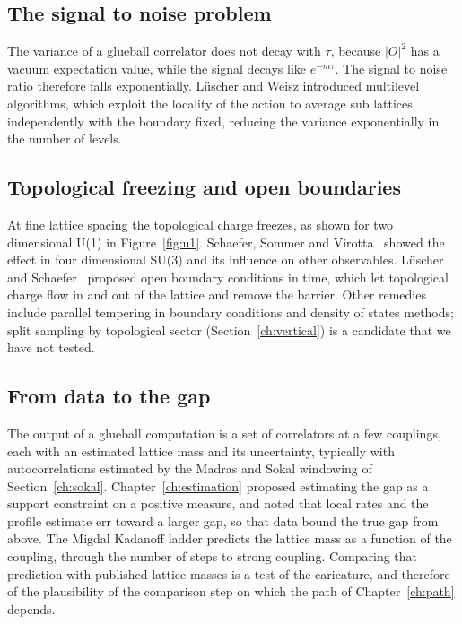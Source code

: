 \subsection{The signal to noise problem}

The variance of a glueball correlator does not decay with $\tau$, because $|O|^2$ has a vacuum expectation value, while the signal decays like $e^{-m\tau}$. The signal to noise ratio therefore falls exponentially. L\"uscher and Weisz\cite{LW01} introduced multilevel algorithms, which exploit the locality of the action to average sub lattices independently with the boundary fixed, reducing the variance exponentially in the number of levels.

\subsection{Topological freezing and open boundaries}

At fine lattice spacing the topological charge freezes, as shown for two dimensional U(1) in Figure~\ref{fig:u1}. Schaefer, Sommer and Virotta~\cite{SSV11} showed the effect in four dimensional SU(3) and its influence on other observables. L\"uscher and Schaefer~\cite{LS11} proposed open boundary conditions in time, which let topological charge flow in and out of the lattice and remove the barrier. Other remedies include parallel tempering in boundary conditions and density of states methods\cite{LLR}; split sampling by topological sector (Section~\ref{ch:vertical}) is a candidate that we have not tested.

\subsection{From data to the gap}

The output of a glueball computation is a set of correlators at a few couplings, each with an estimated lattice mass and its uncertainty, typically with autocorrelations estimated by the Madras and Sokal\cite{MS88} windowing of Section~\ref{ch:sokal}. Chapter~\ref{ch:estimation} proposed estimating the gap as a support constraint on a positive measure, and noted that local rates and the profile estimate err toward a larger gap, so that data bound the true gap from above. The Migdal Kadanoff ladder predicts the lattice mass as a function of the coupling, through the number of steps to strong coupling. Comparing that prediction with published lattice masses\cite{MP,Te98} is a test of the caricature, and therefore of the plausibility of the comparison step on which the path of Chapter~\ref{ch:path} depends.

